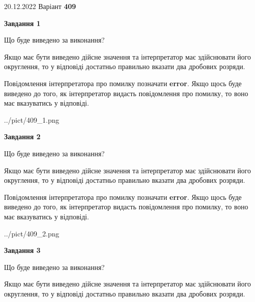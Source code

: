 \documentclass[12pt, ukrainian]{article}
\begin{document}
{20.12.2022 Варіант \No \textbf { 409 }\par}
{
\begin {Large}

{\begin {center}\textbf{Завдання 1}\end {center}}\par
Що буде виведено за виконання? \par

Якщо має бути виведено дійсне значення та інтерпретатор має здійснювати його округлення, 
то у відповіді достатньо правильно вказати два дробових розряди.

Повідомлення інтерпретатора про помилку позначати \textbf{error}.
Якщо щось буде виведено до того, як інтерпретатор видасть повідомлення про помилку, 
то воно має вказуватись у відповіді. \par

\begin{center}
	{../pict/409_1.png}
\end{center}
\newpage

{\begin {center}\textbf{Завдання 2}\end {center}}\par
Що буде виведено за виконання? \par

Якщо має бути виведено дійсне значення та інтерпретатор має здійснювати його округлення, 
то у відповіді достатньо правильно вказати два дробових розряди.

Повідомлення інтерпретатора про помилку позначати \textbf{error}.
Якщо щось буде виведено до того, як інтерпретатор видасть повідомлення про помилку, 
то воно має вказуватись у відповіді. \par

\begin{center}
	{../pict/409_2.png}
\end{center}
\newpage

{\begin {center}\textbf{Завдання 3}\end {center}}\par
Що буде виведено за виконання? \par

Якщо має бути виведено дійсне значення та інтерпретатор має здійснювати його округлення, 
то у відповіді достатньо правильно вказати два дробових розряди.


\end{Large}}
\end{document}
